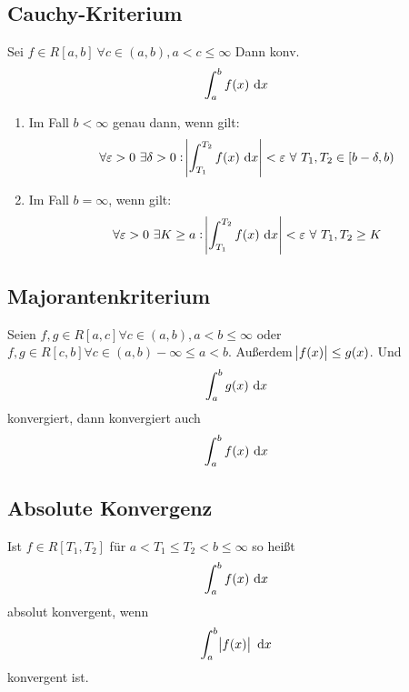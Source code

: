 \subsection{Cauchy-Kriterium}
Sei $f \in R[a,b]\ \forall c \in (a,b), a < c \leq \infty$ Dann konv.
\begin{equation*}
    \int_a^b f(x) \text{ d}x
\end{equation*}
\begin{enumerate}[label= (\alph*)]
    \item Im Fall $b<\infty$ genau dann, wenn gilt:
        \begin{equation*}
            \forall \varepsilon > 0\ \exists \delta > 0: \abs{\int_{T_1}^{T_2} f(x) \text{ d}x} < \varepsilon\ \forall~T_1, T_2 \in [b - \delta, b)
        \end{equation*}
    \item Im Fall $b = \infty$, wenn gilt:
        \begin{equation*}
                \forall \varepsilon > 0\ \exists K \geq a: \abs{\int_{T_1}^{T_2} f(x) \dx} < \varepsilon\ \forall~T_1, T_2 \geq K
        \end{equation*}
\end{enumerate}

\subsection{Majorantenkriterium}
Seien $f, g \in R[a, c] \forall c \in (a,b), a < b \leq \infty$ oder
$f, g \in R[c, b] \forall c \in (a, b) -\infty \leq a < b$.
Außerdem $\abs{f(x)} \leq g(x)$. Und
\begin{equation*}
    \int_a^b g(x) \text{ d}x
\end{equation*}
konvergiert, dann konvergiert auch
\begin{equation*}
    \int_a^b f(x) \text{ d}x
\end{equation*}

\subsection{Absolute Konvergenz}
Ist $f \in R[T_1, T_2]$ für $a < T_1 \leq T_2 < b \leq \infty$ so heißt
\begin{equation*}
    \int_a^b f(x) \text{ d}x
\end{equation*}
absolut konvergent, wenn
\begin{equation*}
    \int_a^b \abs{f(x)} \text{ d}x
\end{equation*}
konvergent ist.

